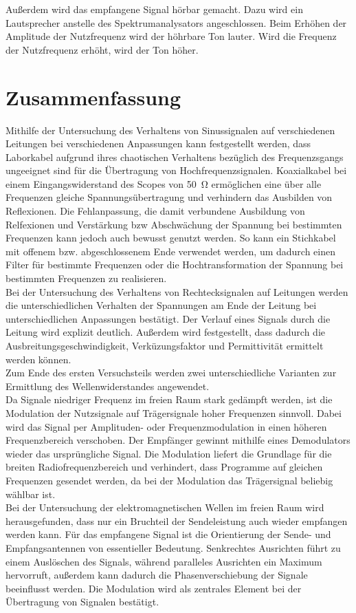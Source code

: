 \documentclass[a4paper,twoside,final]{article}
\begin{document}
Außerdem wird das empfangene Signal hörbar gemacht. Dazu wird ein Lautsprecher anstelle des Spektrumanalysators angeschlossen. Beim Erhöhen der Amplitude der Nutzfrequenz wird der höhrbare Ton lauter. Wird die Frequenz der Nutzfrequenz erhöht, wird der Ton höher.
\section{Zusammenfassung}
Mithilfe der Untersuchung des Verhaltens von Sinussignalen auf verschiedenen Leitungen bei verschiedenen Anpassungen kann festgestellt werden, dass Laborkabel aufgrund ihres chaotischen Verhaltens bezüglich des Frequenzsgangs ungeeignet sind für die Übertragung von Hochfrequenzsignalen. Koaxialkabel bei einem Eingangswiderstand des Scopes von \SI{50}{\ohm} ermöglichen eine über alle Frequenzen gleiche Spannungsübertragung und verhindern das Ausbilden von Reflexionen. Die Fehlanpassung, die damit verbundene Ausbildung von Relfexionen und Verstärkung bzw Abschwächung der Spannung bei bestimmten Frequenzen kann jedoch auch bewusst genutzt werden. So kann ein Stichkabel mit offenem bzw. abgeschlossenem Ende verwendet werden, um dadurch einen Filter für bestimmte Frequenzen oder die Hochtransformation der Spannung bei bestimmten Frequenzen zu realisieren. \\
Bei der Untersuchung des Verhaltens von Rechtecksignalen auf Leitungen werden die unterschiedlichen Verhalten der Spannungen am Ende der Leitung bei unterschiedlichen Anpassungen bestätigt. Der Verlauf eines Signals durch die Leitung wird explizit deutlich. Außerdem wird festgestellt, dass dadurch die Ausbreitungsgeschwindigkeit, Verküzungsfaktor und Permittivität ermittelt werden können.\\ Zum Ende des ersten Versuchsteils werden zwei unterschiedliche Varianten zur Ermittlung des Wellenwiderstandes angewendet.\\
Da Signale niedriger Frequenz im freien Raum stark gedämpft werden, ist die Modulation der Nutzsignale auf Trägersignale hoher Frequenzen sinnvoll. Dabei wird das Signal per Amplituden- oder Frequenzmodulation in einen höheren Frequenzbereich verschoben. Der Empfänger gewinnt mithilfe eines Demodulators wieder das ursprüngliche Signal. Die Modulation liefert die Grundlage für die breiten Radiofrequenzbereich und verhindert, dass Programme auf gleichen Frequenzen gesendet werden, da bei der Modulation das Trägersignal beliebig wählbar ist.\\
Bei der Untersuchung der elektromagnetischen Wellen im freien Raum wird herausgefunden, dass nur ein Bruchteil der Sendeleistung auch wieder empfangen werden kann. Für das empfangene Signal ist die Orientierung der Sende- und Empfangsantennen von essentieller Bedeutung. Senkrechtes Ausrichten führt zu einem Auslöschen des Signals, während paralleles Ausrichten ein Maximum hervorruft, außerdem kann dadurch die Phasenverschiebung der Signale beeinflusst werden. Die Modulation wird als zentrales Element bei der Übertragung von Signalen bestätigt.
\end{document}
